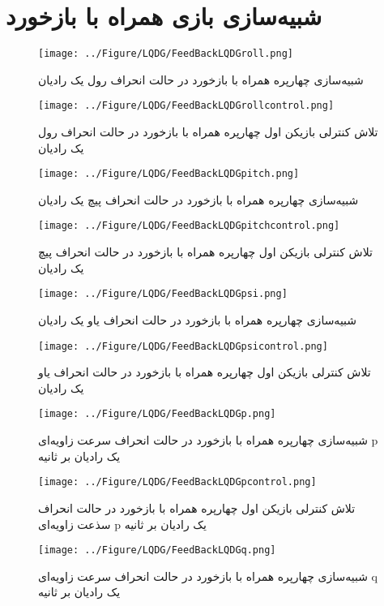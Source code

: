 \section{شبیه‌سازی بازی همراه با بازخورد}
\begin{figure}[H]
	\texttt{[image: ../Figure/LQDG/FeedBackLQDGroll.png]}
	\centering
	\caption{شبیه‌‌سازی چهارپره همراه با بازخورد در حالت انحراف رول یک رادیان}
\end{figure}
\begin{figure}[H]
	\texttt{[image: ../Figure/LQDG/FeedBackLQDGrollcontrol.png]}
	\centering
	\caption{تلاش کنترلی بازیکن اول چهارپره همراه با بازخورد در حالت انحراف رول یک رادیان}
\end{figure}
\begin{figure}[H]
	\texttt{[image: ../Figure/LQDG/FeedBackLQDGpitch.png]}
	\centering
	\caption{شبیه‌‌سازی چهارپره همراه با بازخورد در حالت انحراف پیچ یک رادیان}
\end{figure}
\begin{figure}[H]
	\texttt{[image: ../Figure/LQDG/FeedBackLQDGpitchcontrol.png]}
	\centering
	\caption{تلاش کنترلی بازیکن اول چهارپره همراه با بازخورد در حالت انحراف پیچ یک رادیان}
\end{figure}
\begin{figure}[H]
	\texttt{[image: ../Figure/LQDG/FeedBackLQDGpsi.png]}
	\centering
	\caption{شبیه‌‌سازی چهارپره همراه با بازخورد در حالت انحراف یاو یک رادیان}
\end{figure}
\begin{figure}[H]
	\texttt{[image: ../Figure/LQDG/FeedBackLQDGpsicontrol.png]}
	\centering
	\caption{تلاش کنترلی بازیکن اول چهارپره همراه با بازخورد در حالت انحراف یاو یک رادیان}
\end{figure}
\begin{figure}[H]
	\texttt{[image: ../Figure/LQDG/FeedBackLQDGp.png]}
	\centering
	\caption{شبیه‌‌سازی چهارپره همراه با بازخورد در حالت انحراف سرعت زاویه‌ای p 
		یک رادیان بر ثانیه}
\end{figure}
\begin{figure}[H]
	\texttt{[image: ../Figure/LQDG/FeedBackLQDGpcontrol.png]}
	\centering
	\caption{تلاش کنترلی بازیکن اول چهارپره همراه با بازخورد در حالت انحراف سذعت زاویه‌ای p 
		یک رادیان بر ثانیه}
\end{figure}
\begin{figure}[H]
	\texttt{[image: ../Figure/LQDG/FeedBackLQDGq.png]}
	\centering
	\caption{شبیه‌‌سازی چهارپره همراه با بازخورد در حالت انحراف سرعت زاویه‌ای q 
		یک رادیان بر ثانیه}
\end{figure}
